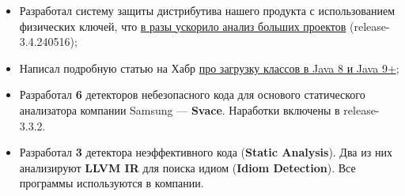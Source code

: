 \documentclass[10pt,a4paper,ragged2e,withhyper]{custom-altacv}
\begin{document}


\makecvheader



\begin{paracol}{2}


\begin{itemize}
	\item Разработал систему защиты дистрибутива нашего продукта с использованием физических ключей, что \href{https://svace.pages.ispras.ru/svace-website/2024/05/16/release-3-4-240516.html}{\textcolor{url}{в разы ускорило анализ больших проектов}} (release-3.4.240516);
	\item Написал подробную статью на Хабр
	\href{https://habr.com/ru/companies/isp_ras/articles/788618/}{\textcolor{url}{про загрузку классов в Java 8 и Java 9+}};
	\item Разработал \textbf{6} детекторов небезопасного кода для основого статического анализатора компании Samsung --- \textbf{Svace}. Наработки включены в release-3.3.2.
\end{itemize}

\divider


\begin{itemize}
	\item Разработал \textbf{3} детектора неэффективного кода (\textbf{Static Analysis}). Два из них анализируют \textbf{LLVM IR} для поиска идиом (\textbf{Idiom Detection}). Все программы используются в компании.
\end{itemize}




\end{paracol}
\end{document}
